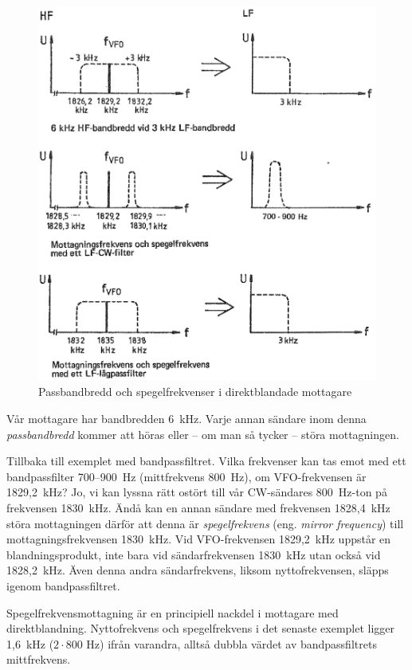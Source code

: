 \begin{figure}
  \includegraphics[width=\textwidth]{images/cropped_pdfs/bild_2_4-12.pdf}
  \caption{Passbandbredd och spegelfrekvenser i direktblandade mottagare}
  \label{fig:bildII4-12}
\end{figure}

Vår mottagare har bandbredden 6~kHz.
Varje annan sändare inom denna \emph{passbandbredd} kommer att höras eller --
om man så tycker -- störa mottagningen.

Tillbaka till exemplet med bandpassfiltret.
Vilka frekvenser kan tas emot med ett bandpassfilter 700--900~Hz
(mittfrekvens 800~Hz), om VFO-frekvensen är 1829,2~kHz?
Jo, vi kan lyssna rätt ostört till vår CW-sändares 800~Hz-ton på frekvensen
1830~kHz.
Ändå kan en annan sändare med frekvensen 1828,4~kHz störa mottagningen därför
att denna är \emph{spegelfrekvens} (eng. \emph{mirror frequency}) till
mottagningsfrekvensen 1830~kHz.
Vid VFO-frekvensen 1829,2~kHz uppstår en blandningsprodukt, inte bara vid
sändarfrekvensen 1830~kHz utan också vid 1828,2~kHz.
Även denna andra sändarfrekvens, liksom nyttofrekvensen, släpps igenom
bandpassfiltret.

Spegelfrekvensmottagning är en principiell nackdel i mottagare med
direktblandning.
Nyttofrekvens och spegelfrekvens i det senaste exemplet ligger 1,6~kHz
(\(2 \cdot 800\) Hz) ifrån varandra, alltså dubbla värdet av bandpassfiltrets
mittfrekvens.

